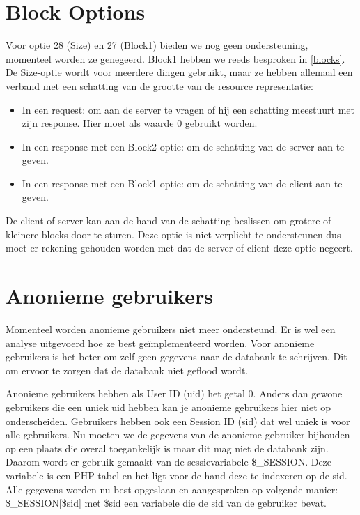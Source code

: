 \section{Block Options} \label{unsupportedBlockOptions}
Voor optie 28 (Size) en 27 (Block1) bieden we nog geen ondersteuning, momenteel worden ze genegeerd. Block1 hebben we reeds besproken in \ref{blocks}. De Size-optie wordt voor meerdere dingen gebruikt, maar ze hebben allemaal een verband met een schatting van de grootte van de resource representatie:
\begin{itemize}
\item In een request: om aan de server te vragen of hij een schatting meestuurt met zijn response. Hier moet als waarde 0 gebruikt worden.
\item In een response met een Block2-optie: om de schatting van de server aan te geven.
\item In een response met een Block1-optie: om de schatting van de client aan te geven.
\end{itemize}
De client of server kan aan de hand van de schatting beslissen om grotere of kleinere blocks door te sturen. Deze optie is niet verplicht te ondersteunen dus moet er rekening gehouden worden met dat de server of client deze optie negeert.

\section{Anonieme gebruikers}
Momenteel worden anonieme gebruikers niet meer ondersteund. Er is wel een analyse uitgevoerd hoe ze best ge\"{i}mplementeerd worden. Voor anonieme gebruikers is het beter om zelf geen gegevens naar de databank te schrijven. Dit om ervoor te zorgen dat de databank niet geflood wordt.

Anonieme gebruikers hebben als User ID (uid) het getal 0. Anders dan gewone gebruikers die een uniek uid hebben kan je anonieme gebruikers hier niet op onderscheiden. Gebruikers hebben ook een Session ID (sid) dat wel uniek is voor alle gebruikers. Nu moeten we de gegevens van de anonieme gebruiker bijhouden op een plaats die overal toegankelijk is maar dit mag niet de databank zijn. Daarom wordt er gebruik gemaakt van de sessievariabele \cite{sessionVariable} \$\_SESSION. Deze variabele is een PHP-tabel en het ligt voor de hand deze te indexeren op de sid. Alle gegevens worden nu best opgeslaan en aangesproken op volgende manier: \$\_SESSION[\$sid] met \$sid een variabele die de sid van de gebruiker bevat. 